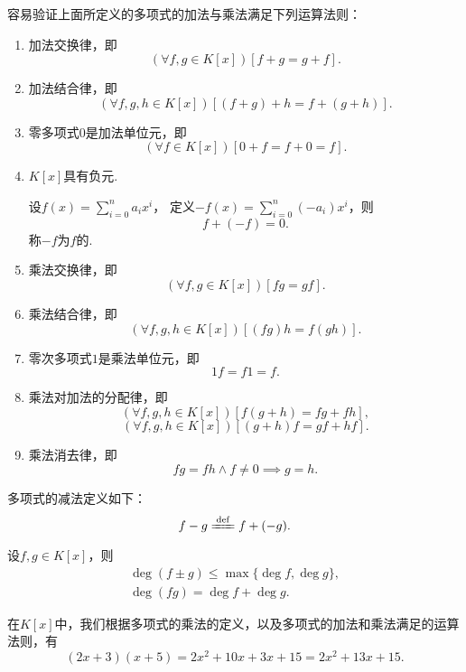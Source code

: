 容易验证上面所定义的多项式的加法与乘法满足下列运算法则：
\begin{enumerate}
	\item 加法交换律，即\[
		(\forall f,g \in K[x])[f+g=g+f].
	\]

	\item 加法结合律，即\[
		(\forall f,g,h \in K[x])[(f+g)+h=f+(g+h)].
	\]

	\item 零多项式\(0\)是加法单位元，即\[
		(\forall f \in K[x])[0+f=f+0=f].
	\]

	\item \(K[x]\)具有负元.

	设\(f(x)=\sum_{i=0}^n a_i x^i\)，
	定义\(-f(x)=\sum_{i=0}^n (-a_i) x^i\)，则\[
		f+(-f)=0.
	\]
	称\(-f\)为\(f\)的.

	\item 乘法交换律，即\[
		(\forall f,g \in K[x])[fg=gf].
	\]

	\item 乘法结合律，即\[
		(\forall f,g,h \in K[x])[(fg)h=f(gh)].
	\]

	\item 零次多项式\(1\)是乘法单位元，即\[
		1f=f1=f.
	\]

	\item 乘法对加法的分配律，即\[
		(\forall f,g,h \in K[x])[f(g+h)=fg+fh],
	\]\[
		(\forall f,g,h \in K[x])[(g+h)f=gf+hf].
	\]

	\item 乘法消去律，即\[
		fg=fh \land f\neq0 \implies g=h.
	\]
\end{enumerate}

多项式的减法定义如下：\begin{equation}
	f-g \defeq f+(-g).
\end{equation}

\begin{proposition}
设\(f,g \in K[x]\)，则\begin{gather}
	\deg(f \pm g) \leq \max\{\deg f, \deg g\}, \\
	\deg(fg) = \deg f + \deg g.
\end{gather}
\end{proposition}

在\(K[x]\)中，我们根据多项式的乘法的定义，以及多项式的加法和乘法满足的运算法则，有
\begin{equation}\label{equation:多项式.示例公式1}
	(2x+3)(x+5)
	=2x^2+10x+3x+15
	=2x^2+13x+15.
\end{equation}

